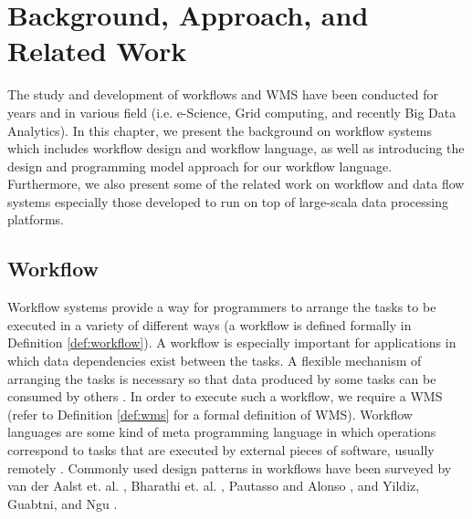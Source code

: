 \chapter{Background, Approach, and Related Work}
\label{chap:background}

The study and development of workflows and WMS have been conducted for years and in various field (i.e. e-Science, Grid computing, and recently Big Data Analytics). In this chapter, we present the background on workflow systems which includes workflow design and workflow language, as well as introducing the design and programming model approach for our workflow language. Furthermore, we also present some of the related work on workflow and data flow systems especially those developed to run on top of large-scala data processing platforms. 

\section{Workflow}\label{sec:workflow}

Workflow systems \cite{yu2005taxonomy,deelman2009workflows,von2007work,barker2008scientific} provide a way for programmers to arrange the tasks to be executed in a variety of different ways (a workflow is defined formally in Definition \ref{def:workflow}). A workflow is especially important for applications in which data dependencies exist between the tasks. A flexible mechanism of arranging the tasks is necessary so that data produced by some tasks can be consumed by others \cite{kelly2011applying}. 
In order to execute such a workflow, we require a WMS \cite{von2007work} (refer to Definition \ref{def:wms} for a formal definition of WMS). Workflow languages are some kind of meta programming language in which operations correspond to tasks that are executed by external pieces of software, usually remotely \cite{kelly2011applying}. Commonly used design patterns in workflows have been surveyed by van der Aalst et. al. \cite{van2003workflow}, Bharathi et. al. \cite{bharathi2008characterization}, Pautasso and Alonso \cite{pautasso2006parallel}, and Yildiz, Guabtni, and Ngu \cite{yildiz2009towards}.

